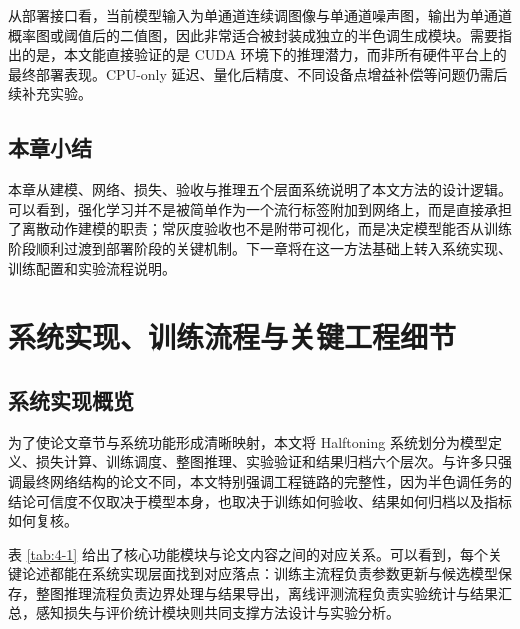 \documentclass[thesis]{../zstucs-graduation-project}
\begin{document}
从部署接口看，当前模型输入为单通道连续调图像与单通道噪声图，输出为单通道概率图或阈值后的二值图，因此非常适合被封装成独立的半色调生成模块。需要指出的是，本文能直接验证的是 CUDA 环境下的推理潜力，而非所有硬件平台上的最终部署表现。CPU-only 延迟、量化后精度、不同设备点增益补偿等问题仍需后续补充实验。

\subsection{本章小结}
本章从建模、网络、损失、验收与推理五个层面系统说明了本文方法的设计逻辑。可以看到，强化学习并不是被简单作为一个流行标签附加到网络上，而是直接承担了离散动作建模的职责；常灰度验收也不是附带可视化，而是决定模型能否从训练阶段顺利过渡到部署阶段的关键机制。下一章将在这一方法基础上转入系统实现、训练配置和实验流程说明。

\section{系统实现、训练流程与关键工程细节}

\subsection{系统实现概览}
为了使论文章节与系统功能形成清晰映射，本文将 Halftoning 系统划分为模型定义、损失计算、训练调度、整图推理、实验验证和结果归档六个层次。与许多只强调最终网络结构的论文不同，本文特别强调工程链路的完整性，因为半色调任务的结论可信度不仅取决于模型本身，也取决于训练如何验收、结果如何归档以及指标如何复核。

表 \ref{tab:4-1} 给出了核心功能模块与论文内容之间的对应关系。可以看到，每个关键论述都能在系统实现层面找到对应落点：训练主流程负责参数更新与候选模型保存，整图推理流程负责边界处理与结果导出，离线评测流程负责实验统计与结果汇总，感知损失与评价统计模块则共同支撑方法设计与实验分析。
\end{document}
